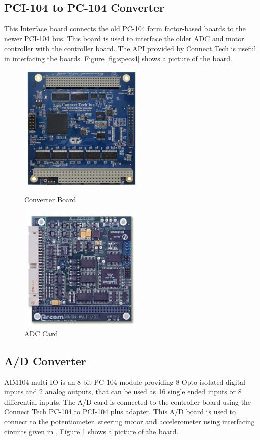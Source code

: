 \subsection{PCI-104 to PC-104 Converter}
This Interface board connects the old PC-104 form factor-based boards to the newer PCI-104 bus. This board is used to interface the older ADC and motor controller with the controller board. The API provided by Connect Tech is useful in interfacing the boards. Figure \ref{fig:specs4} shows a picture of the board.
\begin{figure}[ht]
\begin{minipage}[b]{0.45\linewidth}
    \centering
    \includegraphics[width=6cm,height=6cm,keepaspectratio]{Pictures/bridge.jpg}
    \caption{ Converter Board}
    \label{fig:specs4}
\end{minipage}
\begin{minipage}[b]{0.45\linewidth}
    \centering
    \includegraphics[width=6cm,height=6cm,keepaspectratio]{Pictures/multiIO.jpg}
    \caption{ADC Card}
    \label{fig:specs5}
\end{minipage}
\end{figure}


\subsection{A/D Converter}
AIM104 multi IO is an 8-bit PC-104 module providing 8 Opto-isolated digital inputs and 2 analog outputs, that can be used as 16 single ended inputs or 8 differential inputs. The A/D card is connected to the controller board using the Connect Tech PC-104 to PCI-104 plus adapter. This A/D board is used to connect to the potentiometer, steering motor and accelerometer using interfacing circuits given in \cite{dhake2007real, woodley1999testbed}, Figure \ref{fig:specs5} shows a picture of the board.

